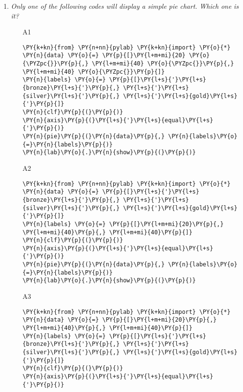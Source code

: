 \begin{enumerate}
\vspace{6mm}

\item {\em Only one of the following codes will display a simple pie chart. Which one is it?}\\

\begin{enumerate}
\item[A1] 
\begin{Verbatim}[commandchars=\\\{\}]
\PY{k+kn}{from} \PY{n+nn}{pylab} \PY{k+kn}{import} \PY{o}{*}
\PY{n}{data} \PY{o}{=} \PY{p}{[}\PY{l+m+mi}{20} \PY{o}{\PYZpc{}}\PY{p}{,} \PY{l+m+mi}{40} \PY{o}{\PYZpc{}}\PY{p}{,} \PY{l+m+mi}{40} \PY{o}{\PYZpc{}}\PY{p}{]}
\PY{n}{labels} \PY{o}{=} \PY{p}{[}\PY{l+s}{'}\PY{l+s}{bronze}\PY{l+s}{'}\PY{p}{,} \PY{l+s}{'}\PY{l+s}{silver}\PY{l+s}{'}\PY{p}{,} \PY{l+s}{'}\PY{l+s}{gold}\PY{l+s}{'}\PY{p}{]}
\PY{n}{clf}\PY{p}{(}\PY{p}{)}
\PY{n}{axis}\PY{p}{(}\PY{l+s}{'}\PY{l+s}{equal}\PY{l+s}{'}\PY{p}{)}
\PY{n}{pie}\PY{p}{(}\PY{n}{data}\PY{p}{,} \PY{n}{labels}\PY{o}{=}\PY{n}{labels}\PY{p}{)}
\PY{n}{lab}\PY{o}{.}\PY{n}{show}\PY{p}{(}\PY{p}{)}
\end{Verbatim}
\item[A2] 
\begin{Verbatim}[commandchars=\\\{\}]
\PY{k+kn}{from} \PY{n+nn}{pylab} \PY{k+kn}{import} \PY{o}{*}
\PY{n}{data} \PY{o}{=} \PY{p}{[}\PY{l+s}{'}\PY{l+s}{bronze}\PY{l+s}{'}\PY{p}{,} \PY{l+s}{'}\PY{l+s}{silver}\PY{l+s}{'}\PY{p}{,} \PY{l+s}{'}\PY{l+s}{gold}\PY{l+s}{'}\PY{p}{]}
\PY{n}{labels} \PY{o}{=} \PY{p}{[}\PY{l+m+mi}{20}\PY{p}{,} \PY{l+m+mi}{40}\PY{p}{,} \PY{l+m+mi}{40}\PY{p}{]}
\PY{n}{clf}\PY{p}{(}\PY{p}{)}
\PY{n}{axis}\PY{p}{(}\PY{l+s}{'}\PY{l+s}{equal}\PY{l+s}{'}\PY{p}{)}
\PY{n}{pie}\PY{p}{(}\PY{n}{data}\PY{p}{,} \PY{n}{labels}\PY{o}{=}\PY{n}{labels}\PY{p}{)}
\PY{n}{lab}\PY{o}{.}\PY{n}{show}\PY{p}{(}\PY{p}{)}
\end{Verbatim}
\item[A3]
\begin{Verbatim}[commandchars=\\\{\}]
\PY{k+kn}{from} \PY{n+nn}{pylab} \PY{k+kn}{import} \PY{o}{*}
\PY{n}{data} \PY{o}{=} \PY{p}{[}\PY{l+m+mi}{20}\PY{p}{,} \PY{l+m+mi}{40}\PY{p}{,} \PY{l+m+mi}{40}\PY{p}{]}
\PY{n}{labels} \PY{o}{=} \PY{p}{[}\PY{l+s}{'}\PY{l+s}{bronze}\PY{l+s}{'}\PY{p}{,} \PY{l+s}{'}\PY{l+s}{silver}\PY{l+s}{'}\PY{p}{,} \PY{l+s}{'}\PY{l+s}{gold}\PY{l+s}{'}\PY{p}{]}
\PY{n}{clf}\PY{p}{(}\PY{p}{)}
\PY{n}{axis}\PY{p}{(}\PY{l+s}{'}\PY{l+s}{equal}\PY{l+s}{'}\PY{p}{)}

\end{Verbatim}
\end{enumerate}
\end{enumerate}
